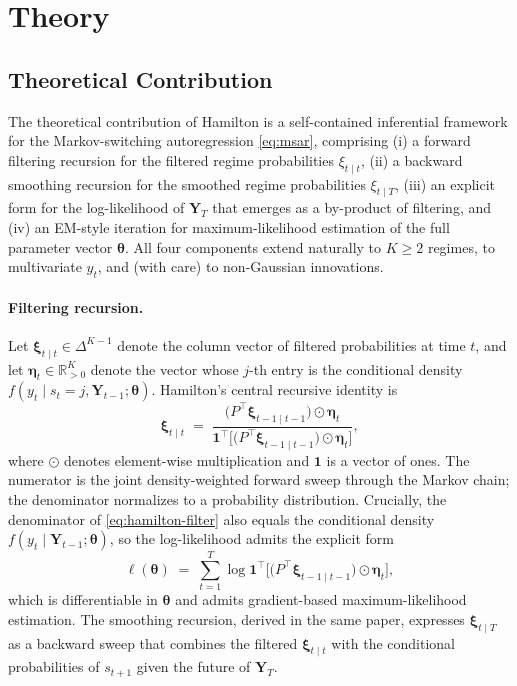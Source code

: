 \documentclass[11pt]{article}
\begin{document}
\section{Theory}

\subsection{Theoretical Contribution}
\label{sec:hamilton-contrib}

The theoretical contribution of Hamilton \cite{hamilton1989} is a self-contained inferential framework for the Markov-switching autoregression \eqref{eq:msar}, comprising (i) a forward filtering recursion for the filtered regime probabilities $\xi_{t \mid t}$, (ii) a backward smoothing recursion for the smoothed regime probabilities $\xi_{t \mid T}$, (iii) an explicit form for the log-likelihood of $\bm{Y}_T$ that emerges as a by-product of filtering, and (iv) an EM-style iteration for maximum-likelihood estimation of the full parameter vector $\bm{\theta}$.  All four components extend naturally to $K \geq 2$ regimes, to multivariate $y_t$, and (with care) to non-Gaussian innovations.

\paragraph{Filtering recursion.}  Let $\bm{\xi}_{t \mid t} \in \Delta^{K-1}$ denote the column vector of filtered probabilities at time $t$, and let $\bm{\eta}_t \in \mathbb{R}^{K}_{>0}$ denote the vector whose $j$-th entry is the conditional density $f(y_t \mid s_t = j, \bm{Y}_{t-1}; \bm{\theta})$.  Hamilton's central recursive identity is
\begin{equation}
    \bm{\xi}_{t \mid t} \;=\; \frac{ \bigl( P^{\!\top} \bm{\xi}_{t-1 \mid t-1} \bigr) \odot \bm{\eta}_t }{ \bm{1}^{\!\top}\!\bigl[ \bigl(P^{\!\top} \bm{\xi}_{t-1 \mid t-1}\bigr) \odot \bm{\eta}_t \bigr] },
\label{eq:hamilton-filter}
\end{equation}
where $\odot$ denotes element-wise multiplication and $\bm{1}$ is a vector of ones.  The numerator is the joint density-weighted forward sweep through the Markov chain; the denominator normalizes to a probability distribution.  Crucially, the denominator of \eqref{eq:hamilton-filter} also equals the conditional density $f(y_t \mid \bm{Y}_{t-1}; \bm{\theta})$, so the log-likelihood admits the explicit form
\begin{equation}
    \ell(\bm{\theta}) \;=\; \sum_{t=1}^{T} \log \bm{1}^{\!\top}\!\bigl[ \bigl(P^{\!\top} \bm{\xi}_{t-1 \mid t-1}\bigr) \odot \bm{\eta}_t \bigr],
\label{eq:hamilton-loglik}
\end{equation}
which is differentiable in $\bm{\theta}$ and admits gradient-based maximum-likelihood estimation.  The smoothing recursion, derived in the same paper, expresses $\bm{\xi}_{t \mid T}$ as a backward sweep that combines the filtered $\bm{\xi}_{t \mid t}$ with the conditional probabilities of $s_{t+1}$ given the future of $\bm{Y}_T$.
\end{document}
